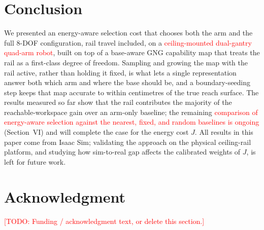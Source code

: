 \documentclass[conference]{IEEEtran}
\newcommand{\TODO}[1]{\textcolor{red}{[TODO: #1]}}
\begin{document}
\section{Conclusion}

We presented an energy-aware selection cost that chooses both the arm and the full
8-DOF configuration, rail travel included, on a \textcolor{red}{ceiling-mounted
dual-gantry quad-arm robot}, built
on top of a base-aware GNG capability map that treats the rail as a first-class
degree of freedom. Sampling and growing the map with the rail active, rather than
holding it fixed, is what lets a single representation answer both which arm and
where the base should be, and a boundary-seeding step keeps that map accurate to
within centimetres of the true reach surface. The results measured so far show
that the rail contributes the majority of the reachable-workspace gain over an
arm-only baseline; the remaining \textcolor{red}{comparison of energy-aware selection
against the nearest, fixed, and random baselines is ongoing} (Section~VI) and will
complete the case for the energy cost $J$. All results in this paper come from Isaac Sim; validating the
approach on the physical ceiling-rail platform, and studying how sim-to-real gap
affects the calibrated weights of $J$, is left for future work.

\section*{Acknowledgment}
\TODO{Funding / acknowledgment text, or delete this section.}
\end{document}
